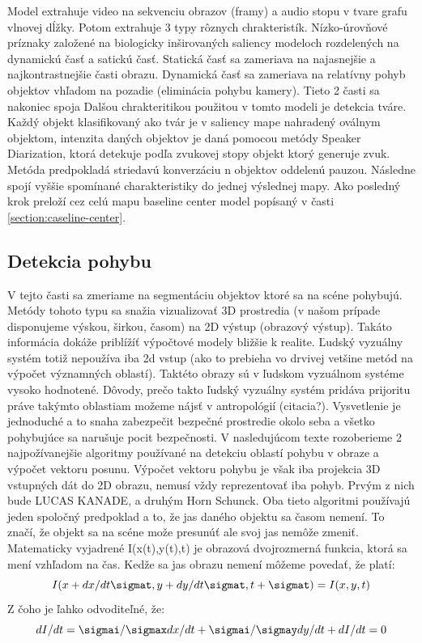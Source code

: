 Model extrahuje video na sekvenciu obrazov (framy) a audio stopu v tvare grafu vlnovej dĺžky.
Potom extrahuje 3 typy rôznych chrakteristík.
Nízko-úrovňové príznaky založené na biologicky inširovaných saliency modeloch rozdelených na dynamickú časť a satickú časť.
Statická časť sa zameriava na najasnejšie a najkontrastnejšie časti obrazu.
Dynamická časť sa zameriava na relatívny pohyb objektov vhľadom na pozadie (eliminácia pohybu kamery).
Tieto 2 časti sa nakoniec spoja
Dalšou chrakteritikou použitou v tomto modeli je detekcia tváre.
Každý objekt klasifikovaný ako tvár je v saliency mape nahradený oválnym objektom, intenzita daných objektov je daná pomocou metódy Speaker Diarization, ktorá detekuje podľa zvukovej stopy objekt ktorý generuje zvuk.
Metóda predpokladá striedavú konverzáciu n objektov oddelenú pauzou.
Následne spojí vyššie spomínané charakteristiky do jednej výslednej mapy.
Ako posledný krok preloží cez celú mapu baseline center model popísaný v časti \ref{section:caseline-center}.

\subsection{Detekcia pohybu}
V tejto časti sa zmeriame na segmentáciu objektov ktoré sa na scéne pohybujú.
Metódy tohoto typu sa snažia vizualizovať 3D prostredia (v našom prípade disponujeme výskou, širkou, časom) na 2D výstup (obrazový výstup).
Takáto informácia dokáže priblížíť výpočtové modely bližšie k realite.
Ľudský vyzuálny systém totiž nepoužíva iba 2d vstup (ako to prebieha vo drvivej vetšine metód na výpočet významných oblastí).
Taktéto obrazy sú v ľudskom vyzuálnom systéme vysoko hodnotené.
Dôvody, prečo takto ľudský vyzuálny systém pridáva prijoritu práve takýmto oblastiam možeme nájsť v antropológií (citacia?).
Vysvetlenie je jednoduché a to snaha zabezpečit bezpečné prostredie okolo seba a všetko pohybujúce sa narušuje pocit bezpečnosti.
V nasledujúcom texte rozoberieme 2 najpožívanejšie algoritmy používané na detekciu oblastí pohybu v obraze a výpočet vektoru posunu.
Výpočet vektoru pohybu je však iba projekcia 3D vstupných dát do 2D obrazu, nemusí vždy reprezentovať iba pohyb.
Prvým z nich bude LUCAS KANADE\cite{lucas-kanade}, a druhým Horn Schunck\cite{horn-schunck}.
Oba tieto algoritmi používajú jeden spoločný predpoklad a to, že jas daného objektu sa časom nemení.
To značí, že objekt sa na scéne može presunúť  ale svoj jas nemôže zmeniť.
Matematicky vyjadrené I(x(t),y(t),t) je obrazová dvojrozmerná funkcia, ktorá sa mení vzhľadom na čas.
Kedže sa jas obrazu nemení môžeme povedať, že platí:
\begin{equation}
  I(x + dx/dt \sigmat ,y + dy/dt \sigmat, t + \sigmat) = I(x,y,t)
\end{equation}
Z čoho je ľahko odvoditeľné, že:
\begin{equation}
  dI/dt = \sigmai/\sigmax dx/dt + \sigmai/\sigmay dy/dt + dI/dt  =  0
\end{equation}

